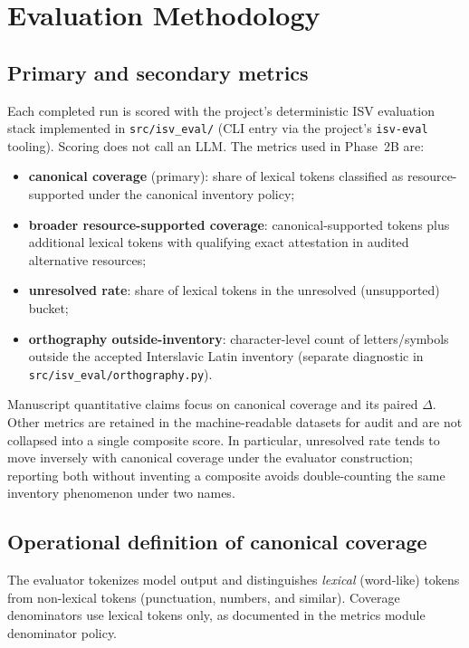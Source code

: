 \section{Evaluation Methodology}
\label{sec:evaluation}

\subsection{Primary and secondary metrics}
Each completed run is scored with the project's deterministic ISV evaluation stack implemented in \texttt{src/isv\_eval/} (CLI entry via the project's \texttt{isv-eval} tooling).
Scoring does not call an LLM.
The metrics used in Phase~2B are:

\begin{itemize}[leftmargin=*]
  \item \textbf{canonical coverage} (primary): share of lexical tokens classified as resource-supported under the canonical inventory policy;
  \item \textbf{broader resource-supported coverage}: canonical-supported tokens plus additional lexical tokens with qualifying exact attestation in audited alternative resources;
  \item \textbf{unresolved rate}: share of lexical tokens in the unresolved (unsupported) bucket;
  \item \textbf{orthography outside-inventory}: character-level count of letters/symbols outside the accepted Interslavic Latin inventory (separate diagnostic in \texttt{src/isv\_eval/orthography.py}).
\end{itemize}

Manuscript quantitative claims focus on canonical coverage and its paired $\Delta$.
Other metrics are retained in the machine-readable datasets for audit and are not collapsed into a single composite score.
In particular, unresolved rate tends to move inversely with canonical coverage under the evaluator construction; reporting both without inventing a composite avoids double-counting the same inventory phenomenon under two names.

\subsection{Operational definition of canonical coverage}
The evaluator tokenizes model output and distinguishes \emph{lexical} (word-like) tokens from non-lexical tokens (punctuation, numbers, and similar).
Coverage denominators use lexical tokens only, as documented in the metrics module denominator policy.

